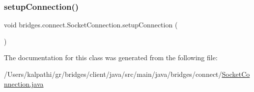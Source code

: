 \mbox{\label{classbridges_1_1connect_1_1_socket_connection_ac5467b4da6cd41b0cee00be5b4cbc60d}} 
\subsubsection{\texorpdfstring{setup\+Connection()}{setupConnection()}}
{\footnotesize\ttfamily void bridges.\+connect.\+Socket\+Connection.\+setup\+Connection (\begin{DoxyParamCaption}{ }\end{DoxyParamCaption})}



The documentation for this class was generated from the following file\+:\begin{DoxyCompactItemize}
\item 
/\+Users/kalpathi/gr/bridges/client/java/src/main/java/bridges/connect/\mbox{\hyperlink{_socket_connection_8java}{Socket\+Connection.\+java}}\end{DoxyCompactItemize}
